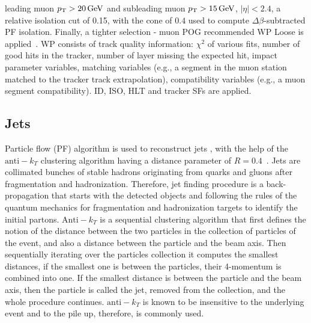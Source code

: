 \noindent leading muon $p_{\mathrm{T}}>20\,\text{Ge\hspace{-.08em}V}$ and subleading muon $p_{\mathrm{T}}>15\,\text{Ge\hspace{-.08em}V}$, $|\eta|<2.4$,
a relative
isolation cut of 0.15, with the cone of $0.4$ used to compute $\Delta\beta$-subtracted PF isolation.
Finally, a tighter selection - muon POG recommended WP Loose is applied~\cite{CMS-PAS-MUO-10-002,MuonsRun2}. WP consists of track quality information: $\chi^2$ of various fits, number of good hits in the tracker, number of layer missing the expected hit, impact parameter variables, matching variables (e.g., a segment in the muon station matched to the tracker track extrapolation), compatibility variables (e.g., a muon segment compatibility). ID, ISO, HLT and tracker SFs are applied.

\subsection{Jets\label{sec:jets}}
    Particle flow (PF) algorithm is used to reconstruct jets \cite{CMS-PAS-PFT-09-001,CMS-PAS-PFT-10-001}, with the help of the  $\text{anti}-k_T$ clustering algorithm having a distance parameter of $R=0.4$~\cite{Cacciari:2005hq,Cacciari:2008gp}. Jets are collimated bunches of 	stable hadrons originating from quarks and gluons after fragmentation and hadronization. Therefore, jet finding procedure is a back-propagation that starts with the detected objects and following the rules of the quantum mechanics for fragmentation and hadronization targets to identify the initial partons. $\text{Anti}-k_T$ is a sequential clustering algorithm that first defines the notion of the distance between the two particles in the collection of particles of the event, and also a distance between the particle and the beam axis. Then sequentially iterating over the particles collection it computes the smallest distances, if the smallest one is between the particles, their 4-momentum is combined into one. If the smallest distance is between the particle and the beam axis, then the particle is called the jet, removed from the collection, and the whole procedure continues. $\text{anti}-k_T$ is known to be insensitive to the underlying event and to the pile up, therefore, is commonly used. 
    
